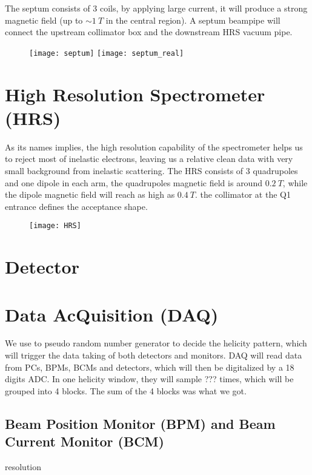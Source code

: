 The septum consists of 3 coils, by applying large current, it will produce a
strong magnetic field (up to $\sim 1 \ T$ in the central region). A septum beampipe
will connect the upstream collimator box and the downstream HRS vacuum pipe.

\begin{figure}[h!]
    \texttt{[image: septum]}
    \texttt{[image: septum\_real]}
\end{figure}

\section{High Resolution Spectrometer (HRS)}
As its names implies, the high resolution capability of the spectrometer helps
us to reject most of inelastic electrons, leaving us a relative clean data with
very small background from inelastic scattering. The HRS consists of 3 quadrupoles 
and one dipole in each arm, the quadrupoles magnetic field is around $0.2 \ T$,
while the dipole magnetic field will reach as high as $0.4 \ T$.
the collimator at the Q1 entrance defines the acceptance shape.
\begin{figure}[h!]
    \centering
    \texttt{[image: HRS]}
\end{figure}

\section{Detector}

\section{Data AcQuisition (DAQ)}
We use to pseudo random number generator to decide the helicity pattern, which
will trigger the data taking of both detectors and monitors. DAQ will read data
from PCs, BPMs, BCMs and detectors, which will then be digitalized by a 18 digits
ADC. In one helicity window, they will sample ??? times, which will be grouped
into 4 blocks. The sum of the 4 blocks was what we got.
\subsection{Beam Position Monitor (BPM) and Beam Current Monitor (BCM)}
resolution
